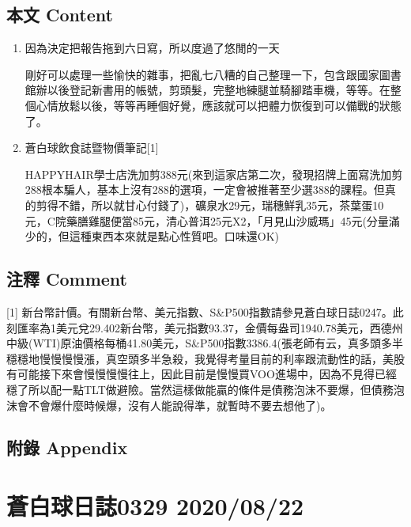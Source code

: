 \documentclass[a5paper, 11pt
]{book}
\begin{document}
\hypertarget{ux672cux6587-content-81}{%
\subsection{本文 Content}\label{ux672cux6587-content-81}}

\begin{enumerate}
\def\labelenumi{\arabic{enumi}.}
\item
  因為決定把報告拖到六日寫，所以度過了悠閒的一天

  剛好可以處理一些愉快的雜事，把亂七八糟的自己整理一下，包含跟國家圖書館辦以後登記新書用的帳號，剪頭髮，完整地練腿並騎腳踏車機，等等。在整個心情放鬆以後，等等再睡個好覺，應該就可以把體力恢復到可以備戰的狀態了。
\item
  蒼白球飲食誌暨物價筆記{[}1{]}

  HAPPYHAIR學士店洗加剪388元(來到這家店第二次，發現招牌上面寫洗加剪288根本騙人，基本上沒有288的選項，一定會被推著至少選388的課程。但真的剪得不錯，所以就甘心付錢了)，礦泉水29元，瑞穗鮮乳35元，茶葉蛋10元，C院藥膳雞腿便當85元，清心普洱25元X2，「月見山沙威瑪」45元(分量滿少的，但這種東西本來就是點心性質吧。口味還OK)
\end{enumerate}

\hypertarget{ux6ce8ux91cb-comment-81}{%
\subsection{注釋 Comment}\label{ux6ce8ux91cb-comment-81}}

{[}1{]}
新台幣計價。有關新台幣、美元指數、S\&P500指數請參見蒼白球日誌0247。此刻匯率為1美元兌29.402新台幣，美元指數93.37，金價每盎司1940.78美元，西德州中級(WTI)原油價格每桶41.80美元，S\&P500指數3386.4(張老師有云，真多頭多半穩穩地慢慢慢慢漲，真空頭多半急殺，我覺得考量目前的利率跟流動性的話，美股有可能接下來會慢慢慢慢往上，因此目前是慢慢買VOO進場中，因為不見得已經穩了所以配一點TLT做避險。當然這樣做能贏的條件是債務泡沫不要爆，但債務泡沫會不會爆什麼時候爆，沒有人能說得準，就暫時不要去想他了)。

\hypertarget{ux9644ux9304-appendix-81}{%
\subsection{附錄 Appendix}\label{ux9644ux9304-appendix-81}}

\hypertarget{ux84bcux767dux7403ux65e5ux8a8c0329-20200822}{%
\section{蒼白球日誌0329
2020/08/22}\label{ux84bcux767dux7403ux65e5ux8a8c0329-20200822}}
\end{document}
